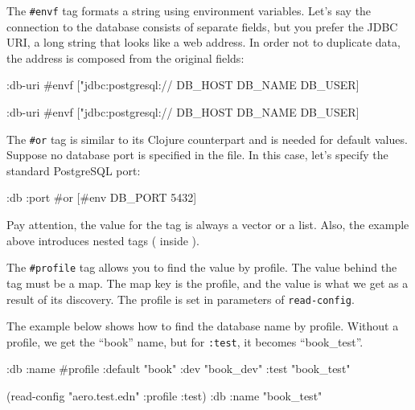 The \verb|#envf| tag formats a string using environment variables. Let's say the connection to the database consists of separate fields, but you prefer the JDBC URI, a long string that looks like a web address. In order not to duplicate data, the address is composed from the original fields:

\ifnarrow

\begin{clojure}
{:db-uri
 #envf ["jdbc:postgresql://%
        DB_HOST DB_NAME DB_USER]}
\end{clojure}

\else

\begin{clojure}
{:db-uri #envf ["jdbc:postgresql://%
                DB_HOST DB_NAME DB_USER]}
\end{clojure}

\fi

The \verb|#or| tag is similar to its Clojure counterpart and is needed for default values. Suppose no database port is specified in the file. In this case, let's specify the standard PostgreSQL port:

\begin{clojure}
{:db {:port #or [#env DB_PORT 5432]}}
\end{clojure}

Pay attention, the value for the tag is always a vector or a list. Also, the example above introduces nested tags ( inside ).


The \verb|#profile| tag allows you to find the value by profile. The value behind the tag must be a map. The map key is the profile, and the value is what we get as a result of its discovery. The profile is set in parameters of \verb|read-config|.

The example below shows how to find the database name by profile. Without a profile, we get the ``book'' name, but for \verb|:test|, it becomes ``book\_test''.

\ifnarrow

\begin{clojure}
{:db
 {:name
  #profile {:default "book"
            :dev     "book_dev"
            :test    "book_test"}}}

(read-config "aero.test.edn"
  {:profile :test})
{:db {:name "book_test"}}
\end{clojure}

\else


